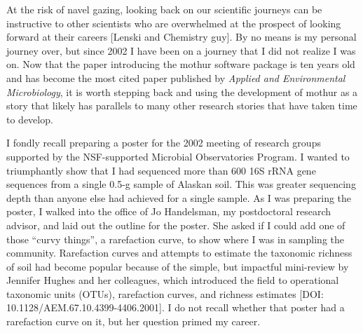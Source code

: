 \documentclass[11pt,]{article}
\begin{document}
At the risk of navel gazing, looking back on our scientific journeys can
be instructive to other scientists who are overwhelmed at the prospect
of looking forward at their careers {[}Lenski and Chemistry guy{]}. By
no means is my personal journey over, but since 2002 I have been on a
journey that I did not realize I was on. Now that the paper introducing
the mothur software package is ten years old and has become the most
cited paper published by \emph{Applied and Environmental Microbiology},
it is worth stepping back and using the development of mothur as a story
that likely has parallels to many other research stories that have taken
time to develop.

I fondly recall preparing a poster for the 2002 meeting of research
groups supported by the NSF-supported Microbial Observatories Program. I
wanted to triumphantly show that I had sequenced more than 600 16S rRNA
gene sequences from a single 0.5-g sample of Alaskan soil. This was
greater sequencing depth than anyone else had achieved for a single
sample. As I was preparing the poster, I walked into the office of Jo
Handelsman, my postdoctoral research advisor, and laid out the outline
for the poster. She asked if I could add one of those ``curvy things'',
a rarefaction curve, to show where I was in sampling the community.
Rarefaction curves and attempts to estimate the taxonomic richness of
soil had become popular because of the simple, but impactful mini-review
by Jennifer Hughes and her colleagues, which introduced the field to
operational taxonomic units (OTUs), rarefaction curves, and richness
estimates {[}DOI: 10.1128/AEM.67.10.4399-4406.2001{]}. I do not recall
whether that poster had a rarefaction curve on it, but her question
primed my career.
\end{document}
